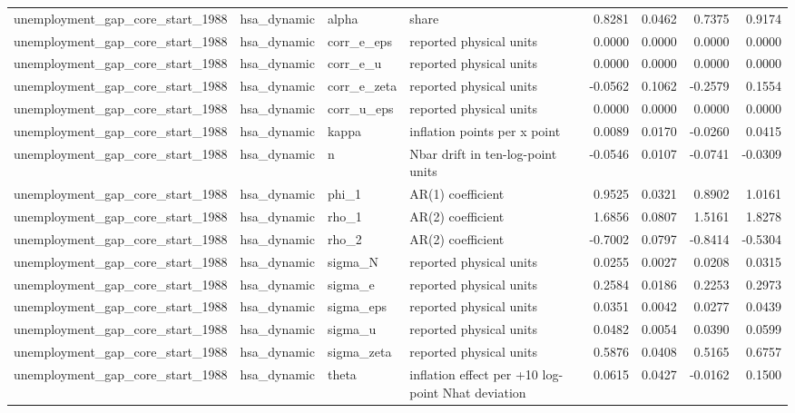 \begin{tabular}{llllrrrr}
unemployment\_gap\_core\_start\_1988 & hsa\_dynamic & alpha & share & 0.8281 & 0.0462 & 0.7375 & 0.9174 \\
unemployment\_gap\_core\_start\_1988 & hsa\_dynamic & corr\_e\_eps & reported physical units & 0.0000 & 0.0000 & 0.0000 & 0.0000 \\
unemployment\_gap\_core\_start\_1988 & hsa\_dynamic & corr\_e\_u & reported physical units & 0.0000 & 0.0000 & 0.0000 & 0.0000 \\
unemployment\_gap\_core\_start\_1988 & hsa\_dynamic & corr\_e\_zeta & reported physical units & -0.0562 & 0.1062 & -0.2579 & 0.1554 \\
unemployment\_gap\_core\_start\_1988 & hsa\_dynamic & corr\_u\_eps & reported physical units & 0.0000 & 0.0000 & 0.0000 & 0.0000 \\
unemployment\_gap\_core\_start\_1988 & hsa\_dynamic & kappa & inflation points per x point & 0.0089 & 0.0170 & -0.0260 & 0.0415 \\
unemployment\_gap\_core\_start\_1988 & hsa\_dynamic & n & Nbar drift in ten-log-point units & -0.0546 & 0.0107 & -0.0741 & -0.0309 \\
unemployment\_gap\_core\_start\_1988 & hsa\_dynamic & phi\_1 & AR(1) coefficient & 0.9525 & 0.0321 & 0.8902 & 1.0161 \\
unemployment\_gap\_core\_start\_1988 & hsa\_dynamic & rho\_1 & AR(2) coefficient & 1.6856 & 0.0807 & 1.5161 & 1.8278 \\
unemployment\_gap\_core\_start\_1988 & hsa\_dynamic & rho\_2 & AR(2) coefficient & -0.7002 & 0.0797 & -0.8414 & -0.5304 \\
unemployment\_gap\_core\_start\_1988 & hsa\_dynamic & sigma\_N & reported physical units & 0.0255 & 0.0027 & 0.0208 & 0.0315 \\
unemployment\_gap\_core\_start\_1988 & hsa\_dynamic & sigma\_e & reported physical units & 0.2584 & 0.0186 & 0.2253 & 0.2973 \\
unemployment\_gap\_core\_start\_1988 & hsa\_dynamic & sigma\_eps & reported physical units & 0.0351 & 0.0042 & 0.0277 & 0.0439 \\
unemployment\_gap\_core\_start\_1988 & hsa\_dynamic & sigma\_u & reported physical units & 0.0482 & 0.0054 & 0.0390 & 0.0599 \\
unemployment\_gap\_core\_start\_1988 & hsa\_dynamic & sigma\_zeta & reported physical units & 0.5876 & 0.0408 & 0.5165 & 0.6757 \\
unemployment\_gap\_core\_start\_1988 & hsa\_dynamic & theta & inflation effect per +10 log-point Nhat deviation & 0.0615 & 0.0427 & -0.0162 & 0.1500 \\

\end{tabular}
